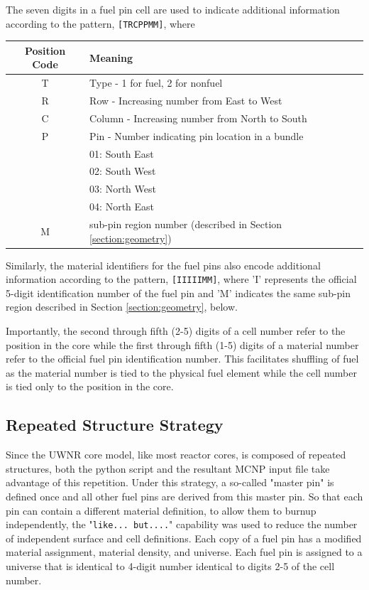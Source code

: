 \documentclass{UWNR_modeling}
\begin{document}
The seven digits in a fuel pin cell are used to indicate additional information according to the pattern, 
\texttt{[TRCPPMM]}, where

\begin{tabular}{|c|l|}
\hline
Position Code & Meaning \\\hline
T & Type     - 1 for fuel, 2 for nonfuel\\
R & Row      - Increasing number from East to West\\
C & Column   - Increasing number from North to South\\
P & Pin      - Number indicating pin location in a bundle\\
 & 01: South East\\
 & 02: South West\\
 & 03: North West\\
 & 04: North East\\
M & sub-pin region number (described in Section \ref{section:geometry})\\\hline
\end{tabular}

Similarly, the material identifiers for the fuel pins also encode additional information according to the pattern,
\texttt{[IIIIIMM]}, where 'I' represents the official 5-digit identification number of the fuel pin and 'M' indicates the same sub-pin region described in Section \ref{section:geometry}, below.

Importantly, the second through fifth (2-5) digits of a cell number refer to the position in the core while the first through fifth (1-5) digits of a material number refer to the official fuel pin identification number.  This facilitates shuffling of fuel as the material number is tied to the physical fuel element while the cell number is tied only to the position in the core.

\subsection{Repeated Structure Strategy}

Since the UWNR core model, like most reactor cores, is composed of repeated structures, both the python script and the resultant MCNP input file take advantage of this repetition.  Under this strategy, a so-called "master pin" is defined once and all other fuel pins are derived from this master pin.  So that each pin can contain a different material definition, to allow them to burnup independently, the "\texttt{like... but....}" capability was used to reduce the number of independent surface and cell definitions.  Each copy of a fuel pin has a modified material assignment, material density, and universe.  Each fuel pin is assigned to a universe that is identical to 4-digit number identical to digits 2-5 of the cell number.  
\end{document}
